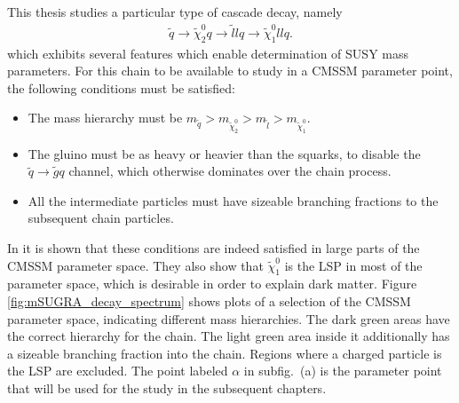 \documentclass[twoside,english]{uiofysmaster}
\begin{document}
This thesis studies a particular type of cascade decay, namely
\begin{align}
	\tilde q \to \tilde\chi_2^0q \to \tilde l l q \to \tilde \chi_1^0 ll q.	\label{eq:susyintrochap_cascade}
\end{align}
which exhibits several features which enable determination of SUSY mass parameters. For this chain to be available to study in a CMSSM parameter point, the following conditions must be satisfied: 
\begin{itemize}
	\item The mass hierarchy must be $m_{\tilde q} > m_{\tilde\chi_2^0} > m_{\tilde l} > m_{\tilde\chi_1^0}$.
	\item The gluino must be as heavy or heavier than the squarks, to disable the $\tilde q \to \tilde g q$ channel, which otherwise dominates over the chain process.
	\item All the intermediate particles must have sizeable branching fractions to the subsequent chain particles.
\end{itemize}
In \cite{Gjelsten:2004ki} it is shown that these conditions are indeed satisfied in large parts of the CMSSM parameter space. They also show that $\tilde\chi_1^0$ is the LSP in most of the parameter space, which is desirable in order to explain dark matter. Figure \ref{fig:mSUGRA_decay_spectrum} shows plots of a selection of the CMSSM parameter space, indicating different mass hierarchies. The dark green areas have the correct hierarchy for the chain. The light green area inside it additionally has a sizeable branching fraction into the chain. Regions where a charged particle is the LSP are excluded. The point labeled $\alpha$ in subfig.\ (a) is the parameter point that will be used for the study in the subsequent chapters.
\end{document}
